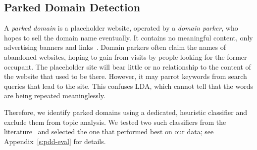 \subsection{Parked Domain Detection}
\label{s:parked_domain}

A \emph{parked domain} is a placeholder website, operated by a
\emph{domain parker}, who hopes to sell the domain name eventually.
It contains no meaningful content, only advertising banners and
links~\cite{vissers2015parking}. Domain parkers often claim the names
of abandoned websites, hoping to gain from visits by people looking
for the former occupant.  The placeholder site will bear little or no
relationship to the content of the website that used to be there.
However, it may parrot keywords from search queries that lead to the
site.  This confuses LDA, which cannot tell that the words are being
repeated meaninglessly.

Therefore, we identify parked domains using a dedicated, heuristic
classifier and exclude them from topic analysis.  We tested two such
classifiers from the literature~\cite{vissers2015parking,
  szurdi2014long} and selected the one that performed best on our
data; see Appendix~\ref{s:pdd-eval} for details.


